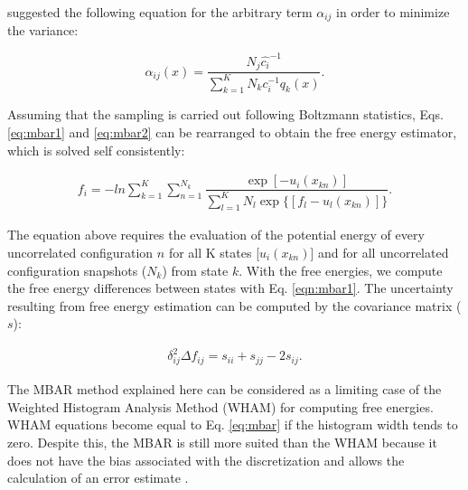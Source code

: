 \documentclass[
	12pt,				%
	openany,			%
	oneside,			%
	a4paper,			%
	english,			%
	brazil				%
	]{abntex2}
\providecommand{\DIFaddbegin}{}
\providecommand{\DIFaddend}{}
\providecommand{\DIFdelbegin}{}
\providecommand{\DIFdelend}{}
\providecommand{\DIFaddbegin}{} %
\providecommand{\DIFaddend}{} %
\providecommand{\DIFdelbegin}{} %
\providecommand{\DIFdelend}{} %
\begin{document}
 suggested the following equation for the arbitrary term $\alpha _{ij}$ in order to minimize the variance:

\begin{equation}
\label{eq:mbar2}
\alpha _{ij} (x) = \frac{N_{j} \hat{c_{i}} ^{-1}}{\sum_{k=1}^{K} N_{k} c_{i} ^{-1} q_{k}(x)} .
\end{equation}

Assuming that the sampling is carried out following Boltzmann statistics, Eqs. \eqref{eq:mbar1} and \eqref{eq:mbar2} can be rearranged to obtain the free energy estimator, which is solved self consistently:  

\begin{equation}
\label{eq:mbar}
\DIFdelbegin %
\DIFdelend \DIFaddbegin \begin{aligned}
f_{i} = -ln \sum_{k=1}^{K} \sum_{n=1}^{N_{k}}
\dfrac{\exp[- u_{i}(x_{kn})]}{\sum_{l=1}^{K} N_{l} \exp \lbrace  [f_{l} - u_{l}(x_{kn})] \rbrace} .
\end{aligned}
\DIFaddend \end{equation}

The equation above requires the evaluation of the potential energy  of every  uncorrelated configuration $n$ for all K states [$u_{i}(x_{kn})$] and for all uncorrelated configuration snapshots ($N_{k}$) from state $k$. With the free energies, we compute the free energy differences between states with Eq. \ref{eqn:mbar1}. The uncertainty resulting from free energy estimation can be computed by the covariance matrix ($s$):

\begin{equation}
\DIFdelbegin %
\DIFdelend \DIFaddbegin \begin{aligned}
\delta _{ij}^{2} \Delta f _{ij} = s_{ii} + s_{jj} - 2 s_{ij}.
\end{aligned}
\DIFaddend \end{equation}

The MBAR method explained here can be considered as a limiting case of the 
Weighted Histogram Analysis Method (WHAM) \cite{wham} for computing free energies. WHAM equations become equal to Eq. \eqref{eq:mbar} if the histogram width tends to zero. Despite this, the MBAR is still more suited than the WHAM because it does not have the bias associated with the discretization and allows the calculation of an error estimate \cite{mbar}.
\end{document}
